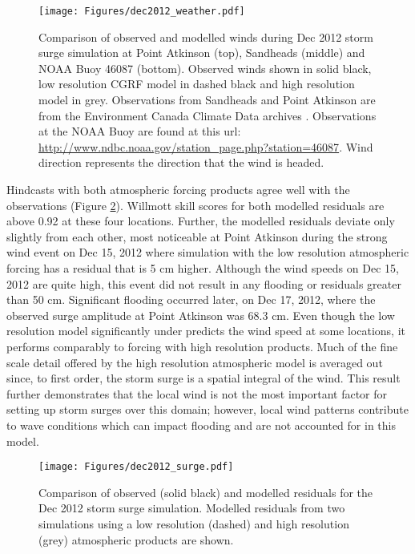\documentclass[letterpaper]{tATO2e}
\begin{document}
\begin{figure}
\centering
\texttt{[image: Figures/dec2012\_weather.pdf]}
\caption{{\color{red}Comparison of observed and modelled winds during Dec 2012 storm surge simulation at Point Atkinson (top), Sandheads (middle) and NOAA Buoy 46087 (bottom). Observed winds shown in solid black, low resolution CGRF model in dashed black and high resolution model in grey. Observations from Sandheads and Point Atkinson are from the Environment Canada Climate Data archives \citep{ECClimateArchive}.  Observations at the NOAA Buoy are found at this url: \url{http://www.ndbc.noaa.gov/station_page.php?station=46087}. Wind direction represents the direction that the wind is headed.} }
\label{fig:dec2012_weather}
\end{figure}

Hindcasts with both atmospheric forcing products agree well with the observations (Figure \ref{fig:dec2012_surge}). Willmott skill scores for both modelled residuals are above 0.92 at these four locations. Further, the modelled residuals deviate only slightly from each other, most noticeable at Point Atkinson during the {\color{red}strong} wind event on Dec 15, 2012 where simulation with the low resolution atmospheric forcing has a residual that is 5 cm higher. Although the wind speeds on Dec 15, 2012 are quite high, this event did not result in any flooding or residuals greater than 50 cm. Significant flooding occurred later, on Dec 17, 2012, where the observed surge amplitude at Point Atkinson was 68.3 cm. Even though the low resolution model significantly under predicts the wind speed at some locations, it performs comparably to forcing with high resolution products. Much of the fine scale detail offered by the high resolution atmospheric model is averaged out since, to first order, the storm surge is a spatial integral of the wind. This result further demonstrates that the local wind is not the most important factor for setting up storm surges over this domain; however, local wind patterns contribute to wave conditions which can impact flooding and are not accounted for in this model. 

\begin{figure}
\centering
\texttt{[image: Figures/dec2012\_surge.pdf]}
\caption{Comparison of observed (solid black) and modelled residuals for the Dec 2012 storm surge simulation. Modelled residuals from two simulations using a low resolution (dashed) and high resolution (grey) atmospheric products are shown. }
\label{fig:dec2012_surge}
\end{figure}
\end{document}
